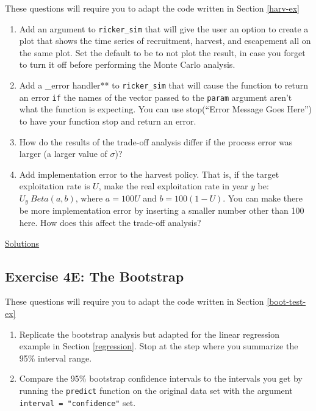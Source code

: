 \documentclass[]{book}
\providecommand{\tightlist}{%
  \setlength{\itemsep}{0pt}\setlength{\parskip}{0pt}}
\theoremstyle{definition}
\theoremstyle{definition}
\theoremstyle{definition}
\theoremstyle{remark}
\begin{document}
These questions will require you to adapt the code written in Section
\ref{harv-ex}

\begin{enumerate}
\def\labelenumi{\arabic{enumi}.}
\tightlist
\item
  Add an argument to \texttt{ricker\_sim} that will give the user an
  option to create a plot that shows the time series of recruitment,
  harvest, and escapement all on the same plot. Set the default to be to
  not plot the result, in case you forget to turn it off before
  performing the Monte Carlo analysis.
\item
  Add a \_error handler** to \texttt{ricker\_sim} that will cause the
  function to return an error \texttt{if} the names of the vector passed
  to the \texttt{param} argument aren't what the function is expecting.
  You can use stop(``Error Message Goes Here'') to have your function
  stop and return an error.
\item
  How do the results of the trade-off analysis differ if the process
  error was larger (a larger value of \(\sigma\))?
\item
  Add implementation error to the harvest policy. That is, if the target
  exploitation rate is \(U\), make the real exploitation rate in year
  \(y\) be: \(U_y ~ Beta(a,b)\), where \(a = 100U\) and
  \(b = 100(1-U)\). You can make there be more implementation error by
  inserting a smaller number other than 100 here. How does this affect
  the trade-off analysis?
\end{enumerate}

\protect\hyperlink{ex4d-answers}{Solutions}

\subsection*{Exercise 4E: The
Bootstrap}\label{exercise-4e-the-bootstrap}

These questions will require you to adapt the code written in Section
\ref{boot-test-ex}

\begin{enumerate}
\def\labelenumi{\arabic{enumi}.}
\tightlist
\item
  Replicate the bootstrap analysis but adapted for the linear regression
  example in Section \ref{regression}. Stop at the step where you
  summarize the 95\% interval range.
\item
  Compare the 95\% bootstrap confidence intervals to the intervals you
  get by running the \texttt{predict} function on the original data set
  with the argument \texttt{interval\ =\ "confidence"} set.
\end{enumerate}
\end{document}
